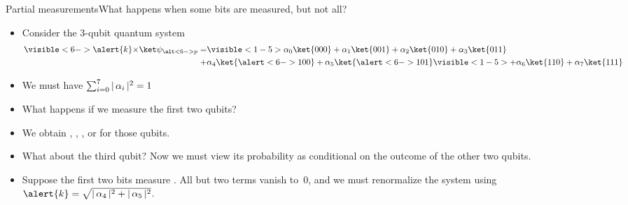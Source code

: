 \begin{frame}{Partial measurements}{What happens when some bits are measured, but not all?}
\begin{itemize}[<+->]
    \item Consider the 3-qubit quantum system
    \begin{align*}
  \visible<6->{\alert{k} \times }\QState{\alt<6->{p}{\relax}}
   = & \visible<1-5>{\alpha_{0} \ket{000}
  +  \alpha_{1} \ket{001}
  +  \alpha_{2} \ket{010}
  +  \alpha_{3} \ket{011} }\\
  +  & \alpha_{4} \ket{\alert<6->{10}0}
  +  \alpha_{5} \ket{\alert<6->{10}1}
 \visible<1-5>{ +  \alpha_{6} \ket{110}
  +  \alpha_{7} \ket{111}}
    \end{align*}
    \item We must have $\sum_{i=0}^{7} |\,\alpha_{i}\,|^{2} = 1$
    \item What happens if we measure the first two qubits? 
    \item We obtain , , , or  for those qubits.
    \item What about the third qubit? Now we must view its probability as conditional on the outcome of the other two qubits.
    \item Suppose the first two bits measure . All but two terms vanish to~$0$, and we must renormalize the system using $\alert{k}=\sqrt{\Prob{\alpha_4} + \Prob{\alpha_5}}$. 
\end{itemize}

    
\end{frame}


